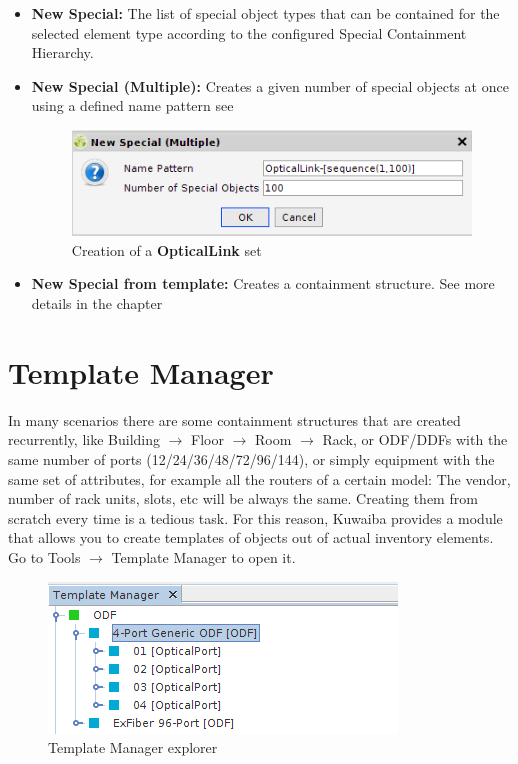 \documentclass[a4paper]{article}
\begin{document}
		\begin{itemize}
			\item \textbf{New Special:} The list of special object types that can be contained for the selected element type according to the configured Special Containment Hierarchy.
			\item \textbf{New Special (Multiple):} Creates a given number of special objects at once using a defined name pattern see \textbf{}
			\begin{figure}[h!]
				\centering
				\includegraphics[width=0.5\linewidth]{img/new_special_multiple.png}
				\caption{Creation of a \textbf{OpticalLink} set}
				\label{fig:new_special_multiple}
			\end{figure}			
			\item \textbf{New Special from template:} Creates a containment structure. See more details in the chapter 
		\end{itemize}
		
		
			
	\newpage
	\section{Template Manager} \label{sec:template_manager}
	In many scenarios there are some containment structures that are created recurrently, like Building $\rightarrow$ Floor $\rightarrow$ Room $\rightarrow$ Rack, or ODF/DDFs with the same number of ports (12/24/36/48/72/96/144), or simply equipment with the same set of attributes, for example all the routers of a certain model: The vendor, number of rack units, slots, etc will be always the same. Creating them from scratch every time is a tedious task. For this reason, Kuwaiba provides a module that allows you to create templates of objects out of actual inventory elements. Go to Tools $\rightarrow$ Template Manager to open it.
	
	\begin{figure}[h!]
		\centering
		\includegraphics[width=0.7\linewidth]{img/template_manager_intro.png}
		\caption{Template Manager explorer}
		\label{fig:template_manager_intro}
	\end{figure}
\end{document}

